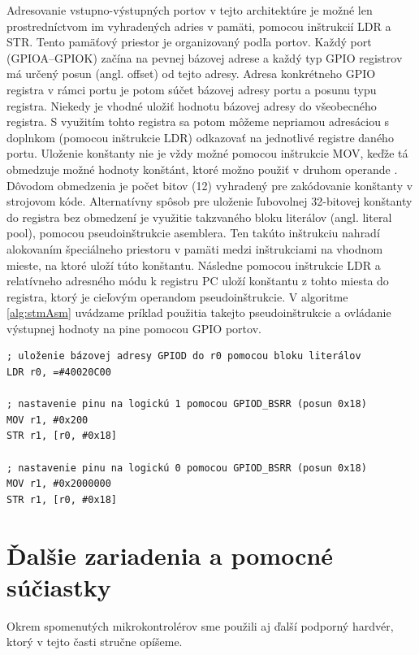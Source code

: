 Adresovanie vstupno-výstupných portov v tejto architektúre je možné len prostredníctvom im vyhradených adries v pamäti, pomocou inštrukcií LDR a STR. Tento pamäťový priestor je organizovaný podľa portov. Každý port (GPIOA--GPIOK) začína na pevnej bázovej adrese a každý typ GPIO registrov má určený posun (angl. offset) od tejto adresy. Adresa konkrétneho GPIO registra v rámci portu je potom súčet bázovej adresy portu a posunu typu registra. Niekedy je vhodné uložiť hodnotu bázovej adresy do všeobecného registra. S využitím tohto registra sa potom môžeme nepriamou adresáciou s doplnkom (pomocou inštrukcie LDR) odkazovať na jednotlivé registre daného portu. Uloženie konštanty nie je vždy možné pomocou inštrukcie MOV, keďže tá obmedzuje možné hodnoty konštánt, ktoré možno použiť v druhom operande \cite{stmInstruction}. Dôvodom obmedzenia je počet bitov (12) vyhradený pre zakódovanie konštanty v strojovom kóde. Alternatívny spôsob pre uloženie ľubovolnej 32-bitovej konštanty do registra bez obmedzení je využitie takzvaného bloku literálov (angl. literal pool), pomocou pseudoinštrukcie asemblera. Ten takúto inštrukciu nahradí alokovaním špeciálneho priestoru v pamäti medzi inštrukciami na vhodnom mieste, na ktoré uloží túto konštantu. Následne pomocou inštrukcie LDR a relatívneho adresného módu k registru PC uloží konštantu z tohto miesta do registra, ktorý je cieľovým operandom pseudoinštrukcie. V algoritme \ref{alg:stmAsm} uvádzame príklad použitia takejto pseudoinštrukcie a ovládanie výstupnej hodnoty na pine pomocou GPIO portov.

\begin{lstlisting}[float,language=AVR,caption={Nastavenie hodnoty výstupného pinu GPIOD 9 na STM32F4 v jazyku asembler. Pre uloženie bázovej adresy portu GPIOD použijeme blok literálov.}, label=alg:stmAsm]
; uloženie bázovej adresy GPIOD do r0 pomocou bloku literálov
LDR r0, =#40020C00

; nastavenie pinu na logickú 1 pomocou GPIOD_BSRR (posun 0x18)
MOV r1, #0x200 
STR r1, [r0, #0x18] 

; nastavenie pinu na logickú 0 pomocou GPIOD_BSRR (posun 0x18)
MOV r1, #0x2000000
STR r1, [r0, #0x18]
\end{lstlisting}

\section{Ďalšie zariadenia a pomocné súčiastky} \label{kap2:sek:dalsieZariadenia}
Okrem spomenutých mikrokontrolérov sme použili aj ďalší podporný hardvér, ktorý v tejto časti stručne opíšeme.

